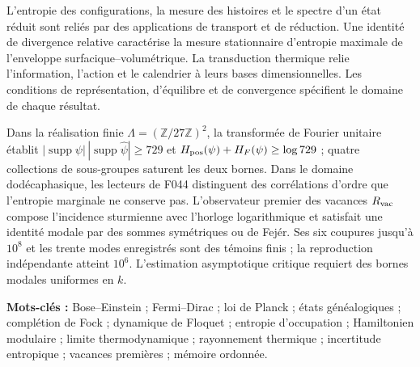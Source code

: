 L’entropie des configurations, la mesure des histoires et le spectre d’un
état réduit sont reliés par des applications de transport et de
réduction. Une identité de divergence relative caractérise la mesure
stationnaire d’entropie maximale de l’enveloppe surfacique--volumétrique.
La transduction thermique relie l’information, l’action et le calendrier à leurs
bases dimensionnelles. Les conditions de représentation, d’équilibre et de
convergence spécifient le domaine de chaque résultat.

Dans la réalisation finie \(\Lambda=(\mathbb Z/27\mathbb Z)^2\), la
transformée de Fourier unitaire établit
\(|\operatorname{supp}\psi|\allowbreak\,|\operatorname{supp}\widehat\psi|\ge729\)
et \(H_{\rm pos}(\psi)\allowbreak+H_F(\psi)\ge\log729\) ; quatre collections de sous-groupes
saturent les deux bornes. Dans le domaine dodécaphasique, les lecteurs de F044
distinguent des corrélations d’ordre que l’entropie marginale ne conserve pas.
L’observateur premier des vacances \(R_{\rm vac}\) compose l’incidence
sturmienne avec l’horloge logarithmique et satisfait une identité modale par
des sommes symétriques ou de Fejér. Ses six coupures jusqu’à \(10^8\) et les trente
modes enregistrés sont des témoins finis ; la reproduction indépendante
atteint \(10^6\). L’estimation asymptotique critique requiert des bornes modales
uniformes en \(k\).

\medskip
\noindent\textbf{Mots-clés :} Bose--Einstein ; Fermi--Dirac ; loi de Planck ;
états généalogiques ; complétion de Fock ; dynamique de Floquet ;
entropie d’occupation ; Hamiltonien modulaire ; limite thermodynamique ;
rayonnement thermique ; incertitude entropique ; vacances premières ; mémoire
ordonnée.
\par\endgroup
